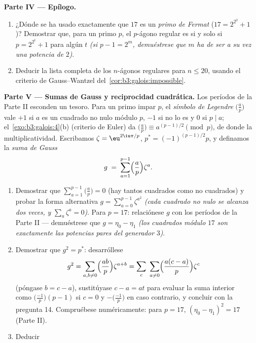 \begin{problem}
\medskip
\noindent\textbf{Parte IV --- Epílogo.}
\begin{enumerate}[resume]
  \item ¿Dónde se ha usado exactamente que $17$ es un \emph{primo de
  Fermat} ($17 = 2^{2^2} + 1$)? Demostrar que, para un primo $p$, el
  $p$-ágono regular es 
  si y solo si $p
        = 2^{2^t} + 1$ para algún $t$ \emph{(si $p - 1 = 2^m$,
  demuéstrese que $m$ ha de ser a su vez una potencia de $2$)}. \item
  Deducir la lista completa de los $n$-ágonos regulares
   para $n \leq 20$,
  usando el criterio de Gauss--Wantzel
  del~\cref{cor:b3:galois:impossible}.
\end{enumerate}

\medskip
\noindent\textbf{Parte V --- Sumas de Gauss y reciprocidad cuadrática.}
Los períodos de la Parte II esconden un tesoro. Para un primo impar $p$,
el \emph{símbolo de Legendre} $\bigl(\frac
ap\bigr)$ vale $+1$ si $a$ es un cuadrado no nulo módulo $p$, $-1$ si no
lo es y $0$ si $p \mid a$; el~\cref{exo:b3:galois:4}(b) (criterio de
Euler) da $\bigl(\frac ap\bigr) \equiv
a^{(p-1)/2} \pmod p$, de donde la multiplicatividad. Escribamos $\zeta =
\eu^{2\iu\pi/p}$, $p^* = (-1)^{(p-1)/2}p$, y definamos la \emph{suma de
Gauss}
\[
g \;=\; \sum_{a=1}^{p-1}\Bigl(\frac ap\Bigr)\zeta^a .
\]
\begin{enumerate}[resume]
  \item Demostrar que $\sum_{a=1}^{p-1}\bigl(\frac ap\bigr) = 0$ (hay
  tantos cuadrados como no cuadrados) y probar la forma alternativa
  $g = \sum_{a=0}^{p-1}\zeta^{a^2}$ \emph{(cada cuadrado no nulo se
  alcanza dos veces, y $\sum_{a}\zeta^a = 0$)}. Para $p = 17$:
  relaciónese $g$ con los períodos de la Parte II --- demuéstrese que
  $g = \eta_0 - \eta_1$ \emph{(los cuadrados módulo $17$ son exactamente
  las potencias pares del generador $3$)}. \item Demostrar que
  $g^2 = p^*$: desarróllese
        \[
        g^2 = \sum_{a,b\neq0}\Bigl(\frac{ab}p\Bigr)
        \zeta^{a+b}
        = \sum_{c}\ \sum_{a \neq 0}\Bigl(\frac{a(c -
        a)}p\Bigr)\zeta^{c}
        \]
        (póngase $b = c - a$), sustitúyase $c - a = at$ para evaluar la
        suma interior como $\bigl(\frac{-1}p\bigr)(p - 1)$ si $c = 0$ y
        $-\bigl(\frac{-1}p\bigr)$ en caso contrario, y concluir con la
        pregunta 14. Compruébese numéricamente: para $p =
        17$, $(\eta_0 - \eta_1)^2 = 17$ (Parte II). \item Deducir

\end{enumerate}
\end{problem}
